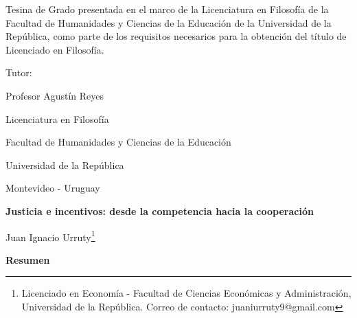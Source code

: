\documentclass[11pt]{article}
\begin{document}
\vspace{30mm}

\large{Tesina de Grado presentada en el marco de la Licenciatura en Filosofía de la Facultad de Humanidades y Ciencias de la Educación de la Universidad de la República, como parte de los requisitos necesarios para la obtención del título de Licenciado en Filosofía.

\vspace{30mm}

\begin{center}

Tutor: 

Profesor Agustín Reyes


\vspace{55mm}

Licenciatura en Filosofía

Facultad de Humanidades y Ciencias de la Educación

Universidad de la República

\vspace{10mm}

Montevideo - Uruguay

    
\end{center}}






\newpage

\doublespacing


\onehalfspacing
\begin{center}
\thispagestyle{empty}
    \huge{\textbf{Justicia e incentivos: desde la competencia hacia la cooperación}}
    
    \renewcommand{\thefootnote}{\fnsymbol{footnote}}
    
    \vspace{10mm}
    
    \large Juan Ignacio Urruty\footnote[1]{Licenciado en Economía - Facultad de Ciencias Económicas y Administración, Universidad de la República. Correo de contacto: juaniurruty9@gmail.com}
    
    \vspace{20mm}
    
   \large \textbf{Resumen}
    
    \vspace{5mm}
    
\end{center}
\end{document}
